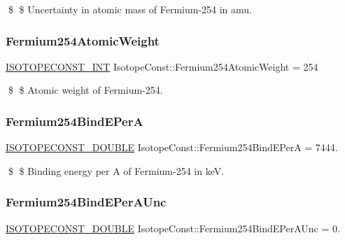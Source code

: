 \$ \$ Uncertainty in atomic mass of Fermium-\/254 in amu. \mbox{\label{group___isotope_const-_fermium-_fm254_ga7177017fd6b981c7f8c32481ed08d936}} 
\subsubsection{\texorpdfstring{Fermium254\+Atomic\+Weight}{Fermium254AtomicWeight}}
{\footnotesize\ttfamily \mbox{\hyperlink{group___isotope_const-_macros_ga5f18360b3e99483a35c32d789e62621c}{I\+S\+O\+T\+O\+P\+E\+C\+O\+N\+S\+T\+\_\+\+I\+NT}} Isotope\+Const\+::\+Fermium254\+Atomic\+Weight = 254}

\$ \$ Atomic weight of Fermium-\/254. \mbox{\label{group___isotope_const-_fermium-_fm254_ga21544952c008a4c2d012f8cdb627772d}} 
\subsubsection{\texorpdfstring{Fermium254\+Bind\+E\+PerA}{Fermium254BindEPerA}}
{\footnotesize\ttfamily \mbox{\hyperlink{group___isotope_const-_macros_ga8f45a7272ce02c0b4c65c44636ed719a}{I\+S\+O\+T\+O\+P\+E\+C\+O\+N\+S\+T\+\_\+\+D\+O\+U\+B\+LE}} Isotope\+Const\+::\+Fermium254\+Bind\+E\+PerA = 7444.}

\$ \$ Binding energy per A of Fermium-\/254 in keV. \mbox{\label{group___isotope_const-_fermium-_fm254_ga3bd0b5566243e76ccf914009853df1e6}} 
\subsubsection{\texorpdfstring{Fermium254\+Bind\+E\+Per\+A\+Unc}{Fermium254BindEPerAUnc}}
{\footnotesize\ttfamily \mbox{\hyperlink{group___isotope_const-_macros_ga8f45a7272ce02c0b4c65c44636ed719a}{I\+S\+O\+T\+O\+P\+E\+C\+O\+N\+S\+T\+\_\+\+D\+O\+U\+B\+LE}} Isotope\+Const\+::\+Fermium254\+Bind\+E\+Per\+A\+Unc = 0.}

